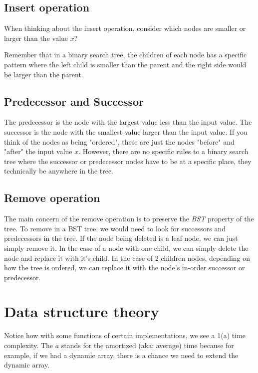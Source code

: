 \documentclass[11pt,a4paper,english]{report}
\begin{document}
\subsection{Insert operation}

When thinking about the insert operation, consider which nodes are smaller or larger than the value $x$?
\bigskip

\noindent Remember that in a binary search tree, the children of each node has a specific pattern where the left child is smaller than the parent and the right side would be larger than the parent.

\subsection{Predecessor and Successor}

The predecessor is the node with the largest value less than the input value. The successor is the node with the smallest value larger than the input value. If you think of the nodes as being "ordered", these are just the nodes "before" and "after" the input value $x$. However, there are no specific rules to a binary search tree where the successor or predecessor nodes have to be at a specific place, they technically be anywhere in the tree.

\subsection{Remove operation}

The main concern of the remove operation is to preserve the \textit{BST} property of the tree. To remove in a BST tree, we would need to look for successors and predecessors in the tree. If the node being deleted is a leaf node, we can just simply remove it. In the case of a node with one child, we can simply delete the node and replace it with it's child. In the case of 2 children nodes, depending on how the tree is ordered, we can replace it with the node's in-order successor or predecessor.

\section{Data structure theory}

\bigskip
\noindent Notice how with some functions of certain implementations, we see a 1(a) time complexity. The $a$ stands for the amortized (aka: average) time because for example, if we had a dynamic array, there is a chance we need to extend the dynamic array.
\end{document}
